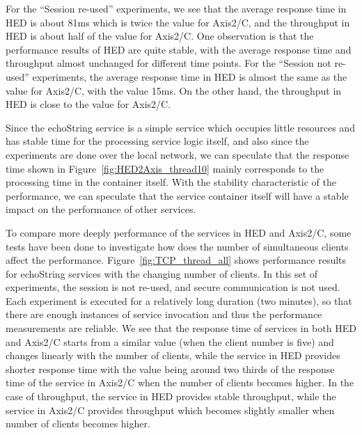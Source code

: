 \documentclass[conference]{IEEEtran}
\begin{document}
For the ``Session re-used'' experiments, we see that the average response time
in HED is about 81ms which is twice the value for Axis2/C, and the throughput in HED is about half
of the value for Axis2/C. One observation is that the performance results of HED are quite stable, with
the average response time and throughput almost unchanged for different time points.
For the ``Session not re-used'' experiments, the average response time in HED is
almost the same as the value for Axis2/C, with the value 15ms. On the other hand, the throughput in
HED is close to the value for Axis2/C. 

Since the echoString service is a simple service which occupies little
resources and has stable time for the processing service logic itself, and also since the experiments are done over the local
network, we can speculate that the response time shown in Figure~\ref{fig:HED2Axis_thread10} mainly
corresponds to the processing time in the container itself.
With the stability characteristic of the performance, we can speculate that the
service container itself will have a stable impact on the performance of other services.

To compare more deeply performance of the services in HED and Axis2/C, some
tests have been done to investigate how does the number of simultaneous clients affect
the performance. Figure~\ref{fig:TCP_thread_all} shows performance results for echoString
services with the changing number of clients. In this set of experiments, the session is not re-used, and secure
communication is not used. Each experiment is executed for a relatively long duration (two minutes),
so that there are enough instances of service invocation and thus the performance measurements are
reliable. We see that the response time of services in both HED and Axis2/C starts from a
similar value (when the client number is five) and changes linearly with the number of
clients, while the service in HED provides shorter response time with the value being around two thirds of the
response time of the service in Axis2/C when the number of clients becomes higher.
In the case of throughput, the service in HED provides stable throughput, while
the service in Axis2/C provides throughput which  becomes slightly smaller when number of clients becomes
higher.
\end{document}
